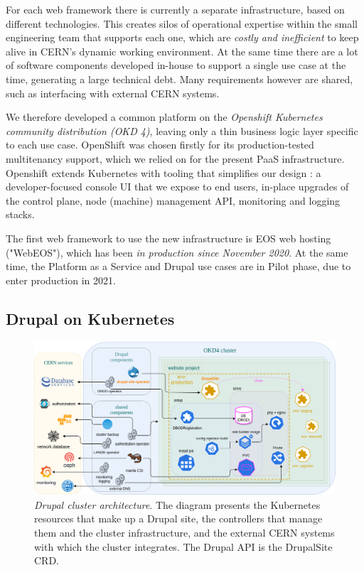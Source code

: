 For each web framework there is currently a separate infrastructure, based on different technologies.
This creates silos of operational expertise within the small engineering team that supports each one, which are \emph{costly and inefficient} to keep alive in CERN's dynamic working environment.
At the same time there are a lot of software components developed in-house to support a single use case at the time, generating a large technical debt.
Many requirements however are shared, such as interfacing with external CERN systems.

We therefore developed a common platform on the \emph{Openshift Kubernetes community distribution (OKD 4)},
leaving only a thin business logic layer specific to each use case.
OpenShift was chosen firstly for its production-tested multitenancy support, which we relied on for the present PaaS infrastructure.
Openshift extends Kubernetes with tooling that simplifies our design \cite{jarvinen_extending_2019}:
a developer-focused console UI that we expose to end users, in-place upgrades of the control plane, node (machine) management API, monitoring and logging stacks.

The first web framework to use the new infrastructure is EOS web hosting ("WebEOS"), which has been \emph{in production since November 2020}.
At the same time, the Platform as a Service and Drupal use cases are in Pilot phase, due to enter production in 2021.

\subsection{Drupal on Kubernetes}

\begin{figure}[t]
    \centering
    \includegraphics[width=1.05\textwidth]{figures/drupal-architecture}
    \caption{\emph{Drupal cluster architecture}.
    The diagram presents the Kubernetes resources that {\color{darkseagreen} make up a Drupal site},
    the {\color{carolinablue} controllers} that manage them and the cluster infrastructure,
    and the {\color{beige} external CERN systems} with which the cluster integrates.
    The Drupal API is the {\color{fluorescentorange} DrupalSite CRD}.}
    \label{fig:drupal-architecture}
\end{figure}

